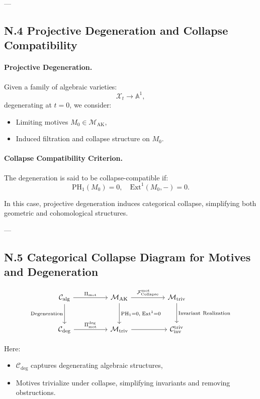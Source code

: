 \documentclass[11pt]{article}
\begin{document}
---

\subsection*{N.4 Projective Degeneration and Collapse Compatibility}

\paragraph{Projective Degeneration.}
Given a family of algebraic varieties:
\[
\mathcal{X}_t \to \mathbb{A}^1,
\]
degenerating at \( t = 0 \), we consider:
\begin{itemize}
  \item Limiting motives \( M_0 \in \mathcal{M}_{\mathrm{AK}} \),
  \item Induced filtration and collapse structure on \( M_0 \).
\end{itemize}

\paragraph{Collapse Compatibility Criterion.}
The degeneration is said to be collapse-compatible if:
\[
\mathrm{PH}_1(M_0) = 0, \quad \mathrm{Ext}^1(M_0, -) = 0.
\]

In this case, projective degeneration induces categorical collapse, simplifying both geometric and cohomological structures.

---

\subsection*{N.5 Categorical Collapse Diagram for Motives and Degeneration}

\[
\begin{tikzcd}[column sep=huge, row sep=large]
\mathcal{C}_{\mathrm{alg}} \arrow[r, "{\Pi_{\mathrm{mot}}}"] \arrow[d, "{\mathrm{Degeneration}}"']
& \mathcal{M}_{\mathrm{AK}} \arrow[r, "{\mathcal{F}_{\mathrm{Collapse}}^{\mathrm{mot}}}"] \arrow[d, "{\mathrm{PH}_1 = 0,\; \mathrm{Ext}^1 = 0}"]
& \mathcal{M}_{\mathrm{triv}} \arrow[d, "{\mathrm{Invariant\ Realization}}"] \\
\mathcal{C}_{\mathrm{deg}} \arrow[r, "{\Pi_{\mathrm{mot}}^{\mathrm{deg}}}"]
& \mathcal{M}_{\mathrm{triv}} \arrow[r]
& \mathcal{C}_{\mathrm{inv}}^{\mathrm{triv}}
\end{tikzcd}
\]

Here:
\begin{itemize}
  \item \( \mathcal{C}_{\mathrm{deg}} \) captures degenerating algebraic structures,
  \item Motives trivialize under collapse, simplifying invariants and removing obstructions.
\end{itemize}
\end{document}
